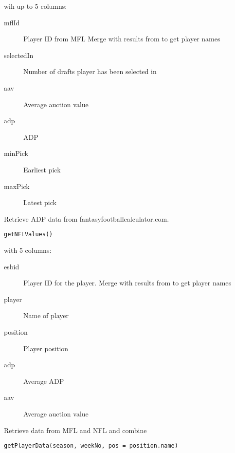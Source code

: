 \documentclass[a4paper]{book}
\begin{document}
%
\begin{Value}
 wih up to 5 columns:
\begin{description}

\item[mflId] Player ID from MFL Merge with results from 
to get player names
\item[selectedIn] Number of drafts player has been selected in
\item[aav] Average auction value
\item[adp] ADP
\item[minPick] Earliest pick
\item[maxPick] Latest pick

\end{description}

\end{Value}
%
\begin{Description}\relax
Retrieve ADP data from fantasyfootballcalculator.com.
\end{Description}
%
\begin{Usage}
\begin{verbatim}
getNFLValues()
\end{verbatim}
\end{Usage}
%
\begin{Value}
 with 5 columns:
\begin{description}

\item[esbid] Player ID for the player. Merge with results from 
to get player names
\item[player] Name of player
\item[position] Player position
\item[adp] Average ADP
\item[aav] Average auction value

\end{description}

\end{Value}
%
\begin{Description}\relax
Retrieve data from MFL and NFL and combine
\end{Description}
%
\begin{Usage}
\begin{verbatim}
getPlayerData(season, weekNo, pos = position.name)
\end{verbatim}
\end{Usage}
\end{document}

